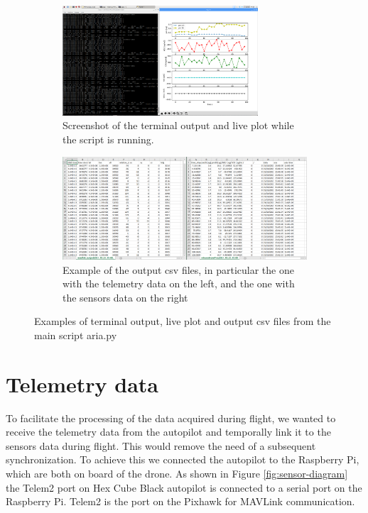 \begin{figure}[H]
    \centering
    \begin{subfigure}[b]{0.9\textwidth}
        \centering
        \includegraphics[width=0.8\textwidth]{images/cmd-and-plot.png}
        \caption{Screenshot of the terminal output and live plot while the script is running.}
        \label{fig:cmd-and-plot}
    \end{subfigure}

    \begin{subfigure}[b]{0.9\textwidth}
        \centering
        \includegraphics[width=\textwidth]{images/csv.PNG}
        \caption{Example of the output csv files, in particular the one with the telemetry data on the left, and the one with the sensors data on the right}
        \label{fig:csv}
    \end{subfigure}
       \caption{Examples of terminal output, live plot and output csv files from the main script aria.py}
       \label{fig:examples-script}
\end{figure}
\section{Telemetry data}
\label{section:telem-data}
To facilitate the processing of the data acquired during flight, we wanted to receive the telemetry data from the autopilot and temporally link it to the sensors data during flight. This would remove the need of a subsequent synchronization. To achieve this we connected the autopilot to the Raspberry Pi, which are both on board of the drone.
As shown in Figure \ref{fig:sensor-diagram} the Telem2 port on Hex Cube Black autopilot is connected to a serial port on the Raspberry Pi. Telem2 is the port on the Pixhawk for MAVLink communication.
